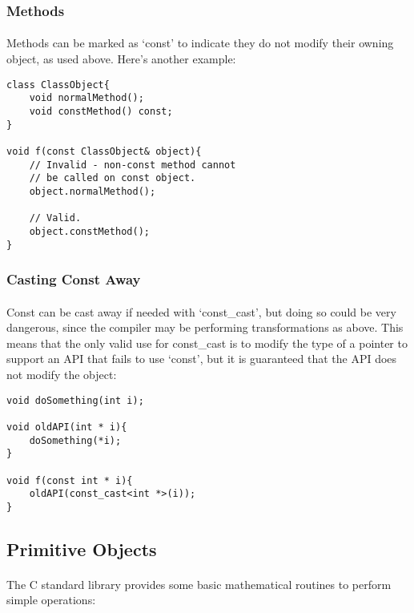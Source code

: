 \documentclass[12pt,twoside,notitlepage]{report}
\begin{document}
\subsubsection{Methods}

\paragraph{}
Methods can be marked as `const' to indicate they do not modify their owning object, as used above. Here's another example:

\begin{lstlisting}
class ClassObject{
	void normalMethod();
	void constMethod() const;
}

void f(const ClassObject& object){
	// Invalid - non-const method cannot
	// be called on const object.
	object.normalMethod();
	
	// Valid.
	object.constMethod();
}
\end{lstlisting}

\subsubsection{Casting Const Away}

\paragraph{}
Const can be cast away if needed with `const\_cast', but doing so could be very dangerous, since the compiler may be performing transformations as above. This means that the only valid use for const\_cast is to modify the type of a pointer to support an API that fails to use `const', but it is guaranteed that the API does not modify the object:

\begin{lstlisting}
void doSomething(int i);

void oldAPI(int * i){
	doSomething(*i);
}

void f(const int * i){
	oldAPI(const_cast<int *>(i));
}
\end{lstlisting}

\clearpage

\subsection{Primitive Objects}

\paragraph{}
The C standard library provides some basic mathematical routines to perform simple operations:
\end{document}
